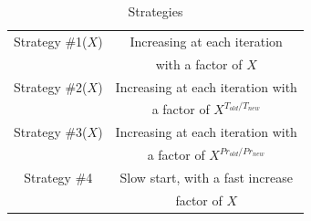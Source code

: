 %
%
%
%
\begin{table}
\begin{center}
\caption{Strategies}
\label{table_strategies}
\begin{tabular}{|c|c|}
\hline
Strategy \#1($X$)  & Increasing at each iteration      \\ 
                   & with a factor of $X$               \\ \hline

Strategy \#2($X$)  & Increasing at each iteration with \\
                   & a factor of $X^{T_{old} / T_{new}}$                   \\ \hline


Strategy \#3($X$) & Increasing at each iteration with \\
                   & a factor of $X^{Pr_{old} / Pr_{new}}$                    \\ \hline
                   Strategy \#4       & Slow start, with a fast increase                      \\ 
     & factor of   $X$                     \\ \hline
            
\end{tabular}
\end{center}
\end{table}

